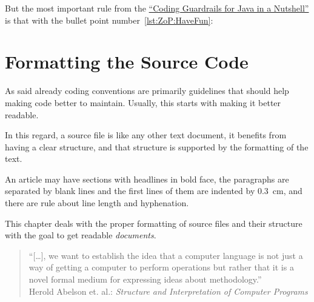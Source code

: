 \documentclass[11pt,a4paper, titlepage, parskip=half, headsepline, footsepline, cleardoublepage=current, headheight=1cm]{scrbook}
\newcommand*{\ngref}{\hyperref[lst:NutshellGuardrails]{“Coding Guardrails for Java in a Nutshell”}}
\begin{document}
But the most important rule from the \ngref{} is that with the bullet point number~\ref{lst:ZoP:HaveFun}:

\begin{center}
	\begin{huge}
	\end{huge}
\end{center}


\chapter{Formatting the Source Code}\label{sec:FormattingTheSourceCode}
As said already coding conventions are primarily guidelines that should help making code better to maintain. Usually, this starts with making it better readable.

In this regard, a source file is like any other text document, it benefits from having a clear structure, and that structure is supported by the formatting of the text.

An article may have sections with headlines in bold face, the paragraphs are separated by blank lines and the first lines of them are indented by 0.3~cm, and there are rule about line length and hyphenation.

This chapter deals with the proper formatting of source files and their structure with the goal to get readable \textit{documents}.

\begin{quotation}
“[…], we want to establish the idea that a computer language is not just a way of getting a computer to perform operations but rather that it is a novel formal medium for expressing ideas
about methodology.”\\
Herold Abelson et. al.: \textit{Structure and Interpretation of Computer Programs}
\autocite{Sussman:StructureAndInterpretationOfComputerPrograms}
\end{quotation}
\end{document}
